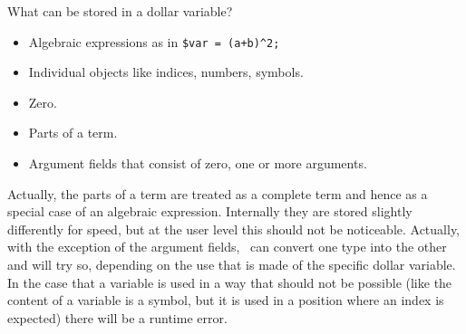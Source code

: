 What can be stored in a dollar variable?
\begin{itemize}
\item Algebraic expressions as in \verb:$var = (a+b)^2;:
\item Individual objects like indices, numbers, symbols.
\item Zero.
\item Parts of a term.
\item Argument fields that consist of zero, one or 
more arguments.
\end{itemize}
Actually, the parts of a term are treated as a complete term and hence as a 
special case of an algebraic expression. Internally they are stored 
slightly differently for speed, but at the user level this should not be 
noticeable. Actually, with the exception of the argument fields, \FORM\ can 
convert one type into the other and will try so, depending on the use that 
is made of the specific dollar variable. In the case that a variable is 
used in a way that should not be possible (like the content of a variable 
is a symbol, but it is used in a position where an index is expected) there 
will be a runtime error.

